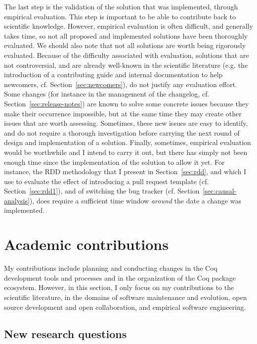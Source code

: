 The last step is the validation of the solution that was implemented, through empirical evaluation.
This step is important to be able to contribute back to scientific knowledge.
However, empirical evaluation is often difficult, and generally takes time, so not all proposed and implemented solutions have been thoroughly evaluated.
We should also note that not all solutions are worth being rigorously evaluated.
Because of the difficulty associated with evaluation, solutions that are not controversial, and are already well-known in the scientific literature (e.g. the introduction of a contributing guide and internal documentation to help newcomers, cf. Section~\ref{sec:newcomers}), do not justify any evaluation effort.
Some changes (for instance in the management of the changelog, cf. Section~\ref{sec:release-notes}) are known to solve some concrete issues because they make their occurrence impossible, but at the same time they may create other issues that are worth assessing.
Sometimes, these new issues are easy to identify, and do not require a thorough investigation before carrying the next round of design and implementation of a solution.
Finally, sometimes, empirical evaluation would be worthwhile and I intend to carry it out, but there has simply not been enough time since the implementation of the solution to allow it yet.
For instance, the RDD methodology that I present in Section~\ref{sec:rdd}, and which I use to evaluate the effect of introducing a pull request template (cf. Section~\ref{sec:rdd1}), and of switching the bug tracker (cf. Section~\ref{sec:causal-analysis}), does require a sufficient time window \emph{around} the date a change was implemented.

\section{Academic contributions}

\label{sec:contributions}

My contributions include planning and conducting changes in the Coq development tools and processes and in the organization of the Coq package ecosystem.
However, in this section, I only focus on my contributions to the scientific literature, in the domains of software maintenance and evolution, open source development and open collaboration, and empirical software engineering.

\subsection{New research questions}

